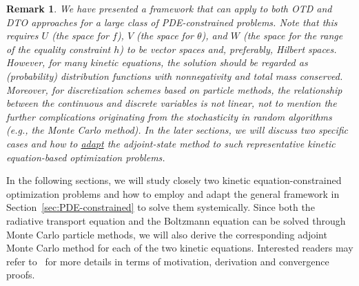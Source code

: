 \documentclass[12pt]{amsart}
\newtheorem{rem}{Remark}
\begin{document}
\begin{rem}
We have presented a framework that can apply to both OTD and DTO approaches for a large class of PDE-constrained problems. Note that this requires $U$ (the space for $f$), $V$ (the space for $\theta$), and $W$ (the space for the range of the equality constraint $h$) to be vector spaces and, preferably, Hilbert spaces. However, for many kinetic equations, the solution should be regarded as (probability) distribution functions with nonnegativity and total mass conserved. Moreover, for discretization schemes based on particle methods, the relationship between the continuous and discrete variables is not linear, not to mention the further complications originating from the stochasticity in random algorithms (e.g., the Monte Carlo method). In the later sections, we will discuss two specific cases and how to \underline{adapt} the adjoint-state method to such representative kinetic equation-based optimization problems. 
\end{rem}
 
In the following sections, we will study closely two kinetic equation-constrained optimization problems and how to employ and adapt the general framework in Section~\ref{sec:PDE-constrained} to solve them systemically. Since both the radiative transport equation and the Boltzmann equation can be solved through Monte Carlo particle methods, we will also derive the corresponding adjoint Monte Carlo method for each of the two kinetic equations. Interested readers may refer to~\cite{caflisch2021adjoint,li2022monte,yang2023adjoint} for more details in terms of motivation, derivation and convergence proofs.
\end{document}
